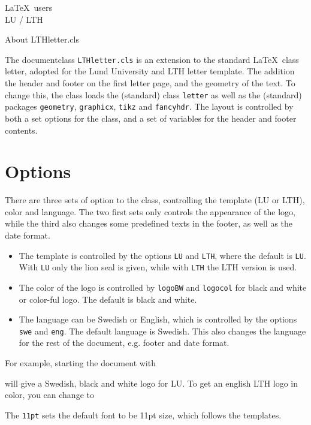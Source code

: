 \documentclass[11pt,eng,LU,logoBW]{LTHletter}
\begin{document}
\begin{letter}{\LaTeX\ users\\ LU / LTH}
  \opening{About LTHletter.cls}
  The documentclass \texttt{LTHletter.cls} is an extension to the standard \LaTeX\ class letter, adopted for the Lund University and LTH letter template. The addition the header and footer on the first letter page, and the geometry of the text. To change this, the class loads the (standard) class \texttt{letter} as well as the (standard) packages \texttt{geometry}, \texttt{graphicx}, \texttt{tikz} and \texttt{fancyhdr}. The layout is controlled by both a set options for the class, and a set of variables for the header and footer contents.

  \section{Options}
  There are three sets of option to the class, controlling the template (LU or LTH), color and language. The two first sets only controls the appearance of the logo, while the third also changes some predefined texts in the footer, as well as the date format.
  \begin{itemize}
  \item The template is controlled by the options \texttt{LU} and \texttt{LTH}, where the default is \texttt{LU}. With \texttt{LU} only the lion seal is given, while with \texttt{LTH} the LTH version is used. 
  \item The color of the logo is controlled by \texttt{logoBW} and \texttt{logocol} for black and white or color-ful logo. The default is black and white.
  \item The language can be Swedish or English, which is controlled by the options \texttt{swe} and \texttt{eng}. The default language is Swedish. This also changes the language for the rest of the document, e.g. footer and date format.
  \end{itemize}
  For example, starting the document with 
  will give a Swedish, black and white logo for LU. To get an english LTH logo in color, you can change to 
  The \texttt{11pt} sets the default font to be 11pt size, which follows the templates.
  

\end{letter}
\end{document}
